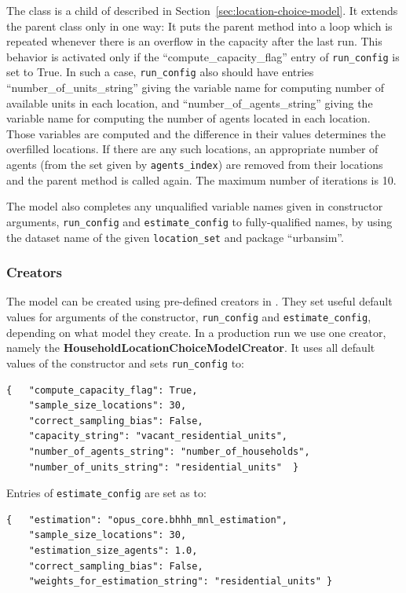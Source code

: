 The class  \modelsindex is a child
of  \modelsindex described in
Section~\ref{sec:location-choice-model}. \modelsindex It extends the
parent class only in one way: It puts the parent method
 into a loop which is repeated whenever there is an
overflow in the capacity after the last run. This behavior is
activated only if the ``compute_capacity_flag'' entry of
\verb|run_config| is set to True. In such a case, \verb|run_config|
also should have entries ``number_of_units_string'' giving the
variable \variablesindex name for computing number of available
units in each location, and ``number_of_agents_string'' giving the
variable \variablesindex name for computing the number of agents
located in each location. Those variables \variablesindex are
computed and the difference in their values determines the
overfilled locations. If there are any such locations, an
appropriate number of agents (from the set given by
\verb|agents_index|) are removed from their locations and the parent
 method is called again. The maximum number of
iterations is 10.

The model \modelsindex also completes any unqualified variable \variablesindex names given in constructor
arguments, \verb|run_config| and \verb|estimate_config| to fully-qualified
names, by using the dataset name of the given \verb|location_set| and package
``urbansim''.

\subsubsection{Creators}
The model can be created using pre-defined creators in .
They set useful default values for arguments of the
 \modelsindex constructor, \verb|run_config| and
\verb|estimate_config|, depending on what model \modelsindex they create. In a production run we use one creator, namely the
{\bf HouseholdLocationChoiceModelCreator}. \modelsindex  It uses all default
  values of the  \modelsindex constructor and sets
  \verb|run_config| to:
\begin{verbatim}
{   "compute_capacity_flag": True,
    "sample_size_locations": 30,
    "correct_sampling_bias": False,
    "capacity_string": "vacant_residential_units",
    "number_of_agents_string": "number_of_households",
    "number_of_units_string": "residential_units"  }
\end{verbatim}
Entries of \verb|estimate_config| are set as to:
\begin{verbatim}
{   "estimation": "opus_core.bhhh_mnl_estimation",
    "sample_size_locations": 30,
    "estimation_size_agents": 1.0,
    "correct_sampling_bias": False,
    "weights_for_estimation_string": "residential_units" }
\end{verbatim}

